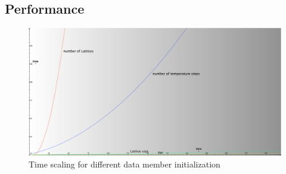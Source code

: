 \documentclass[11pt,a4paper]{article}
\begin{document}






%   














\newpage
\appendix
\subsection*{Performance}
\begin{figure}[h!]
  \centering
   \includegraphics[width=\columnwidth]{img/Andamenti_performance.pdf} 
  \caption{Time scaling for different data member initialization}

\end{figure}
\end{document}
